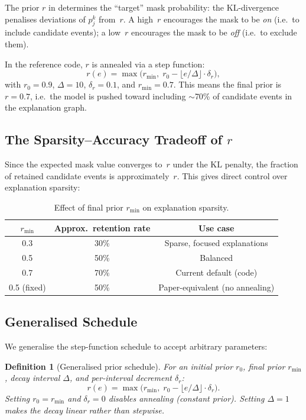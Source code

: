 \documentclass[11pt,a4paper]{article}
\newtheorem{definition}{Definition}
\newcommand{\KL}{\mathrm{KL}}
\begin{document}
The prior $r$ in  determines the ``target'' mask
probability: the $\KL$-divergence penalises deviations of $p_j^k$
from~$r$. A high~$r$ encourages the mask to be \emph{on} (i.e.\ to
include candidate events); a low~$r$ encourages the mask to be
\emph{off} (i.e.\ to exclude them).

In the reference code, $r$ is annealed via a step function:
\begin{equation}
\label{eq:r_step}
r(e) = \max\!\big(
  r_{\min},\;
  r_0 - \lfloor e / \Delta \rfloor \cdot \delta_r
\big),
\end{equation}
with $r_0 = 0.9$, $\Delta = 10$, $\delta_r = 0.1$, and $r_{\min} = 0.7$.
This means the final prior is $r = 0.7$, i.e.\ the model is pushed
toward including $\sim$70\% of candidate events in the explanation
graph.

\subsection{The Sparsity--Accuracy Tradeoff of $r$}

Since the expected mask value converges to~$r$ under the $\KL$
penalty, the fraction of retained candidate events is approximately~$r$.
This gives direct control over explanation sparsity:

\begin{table}[ht]
\centering
\caption{Effect of final prior $r_{\min}$ on explanation sparsity.}
\label{tab:prior_sparsity}
\begin{tabular}{@{}ccc@{}}
\toprule
$r_{\min}$ & Approx.\ retention rate & Use case \\
\midrule
0.3 & 30\% & Sparse, focused explanations \\
0.5 & 50\% & Balanced \\
0.7 & 70\% & Current default (code) \\
0.5 (fixed) & 50\% & Paper-equivalent (no annealing) \\
\bottomrule
\end{tabular}
\end{table}

\subsection{Generalised Schedule}

We generalise the step-function schedule to accept arbitrary
parameters:

\begin{definition}[Generalised prior schedule]
\label{def:prior_schedule}
For an initial prior $r_0$, final prior $r_{\min}$, decay interval
$\Delta$, and per-interval decrement $\delta_r$:
\begin{equation}
\label{eq:prior_general}
r(e) = \max\!\big(
  r_{\min},\;
  r_0 - \lfloor e / \Delta \rfloor \cdot \delta_r
\big).
\end{equation}
Setting $r_0 = r_{\min}$ and $\delta_r = 0$ disables annealing
(constant prior). Setting $\Delta = 1$ makes the decay linear rather
than stepwise.
\end{definition}
\end{document}
